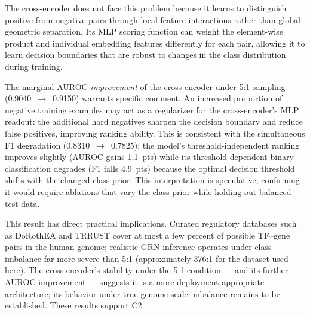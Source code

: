 \documentclass[journal]{IEEEtran}
\begin{document}
The cross-encoder does not face this problem because it learns to distinguish
positive from negative pairs through local feature interactions rather than
global geometric separation. Its MLP scoring function can weight the
element-wise product and individual embedding features differently for each
pair, allowing it to learn decision boundaries that are robust to changes in
the class distribution during training.

The marginal AUROC \emph{improvement} of the cross-encoder under 5:1 sampling
(0.9040~$\to$~0.9150) warrants specific comment. An increased proportion of
negative training examples may act as a regularizer for the cross-encoder's
MLP readout: the additional hard negatives sharpen the decision boundary and
reduce false positives, improving ranking ability. This is consistent with
the simultaneous F1 degradation (0.8310~$\to$~0.7825): the model's
threshold-independent ranking improves slightly (AUROC gains 1.1~pts) while
its threshold-dependent binary classification degrades (F1 falls 4.9~pts)
because the optimal decision threshold shifts with the changed class prior.
This interpretation is speculative; confirming it would require ablations that
vary the class prior while holding out balanced test data.

This result has direct practical implications. Curated regulatory databases
such as DoRothEA and TRRUST cover at most a few percent of possible TF--gene
pairs in the human genome; realistic GRN inference operates under
class imbalance far more severe than 5:1 (approximately 376:1 for the
dataset used here). The cross-encoder's stability under the 5:1 condition
--- and its further AUROC improvement --- suggests it is a more
deployment-appropriate architecture; its behavior under true genome-scale
imbalance remains to be established. These
results support C2.

\begin{table}[!t]
  \caption{Performance Across Negative Sampling Ratios (Mean $\pm$ Std, 5 Seeds).
    AUPRC values at 1:1 and 5:1 shown. F1 and Std refer to macro F1 and AUROC std.}
  \label{tab:imbalance}
  \centering
\end{table}
\end{document}
